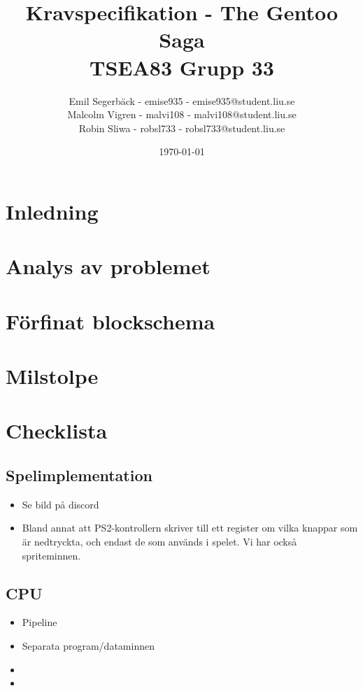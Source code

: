 \documentclass[a4paper,titlepage]{article}
\title{
\textbf{Kravspecifikation - The Gentoo Saga} \\
\large TSEA83 Grupp 33}
\date{\today}
\author{
        Emil Segerbäck - emise935 - emise935@student.liu.se\\
		Malcolm Vigren - malvi108 - malvi108@student.liu.se \\
		Robin Sliwa - robsl733 - robsl733@student.liu.se }
\begin{document}
    \maketitle
    \newpage

\section{Inledning}

\newpage
\section{Analys av problemet}

\newpage
\section{Förfinat blockschema}

\newpage
\section{Milstolpe}
 
\newpage
\section{Checklista}
    \subsection{Spelimplementation}
        \begin{itemize}
            \item Se bild på discord
            \item Bland annat att PS2-kontrollern skriver till ett register om
                vilka knappar som är nedtryckta, och endast de som används i
                spelet. Vi har också spriteminnen.
        \end{itemize}
    \subsection{CPU}
        \begin{itemize}
            \item Pipeline
            \item Separata program/dataminnen
            \item 
            \item  
        \end{itemize}
\end{document}
